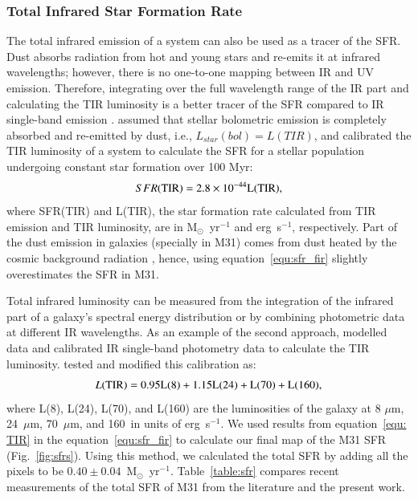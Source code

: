 \subsubsection{Total Infrared Star Formation Rate}
\label{sec:sfr_fir}
The total infrared emission of a system can also be used as a tracer of the SFR. Dust absorbs radiation from hot and young stars and re-emits it at infrared wavelengths; however, there is no one-to-one mapping between IR and UV emission. Therefore, integrating over the full wavelength range of the IR part and calculating the TIR luminosity is a better tracer of the SFR compared to IR single-band emission \citep{Calzetti13}. \citet{Calzetti13} assumed that stellar bolometric emission is completely absorbed and re-emitted by dust, i.e., $L_{star}(bol) = L(TIR)$, and calibrated the TIR luminosity of a system to calculate the SFR for a stellar population undergoing constant star formation over 100 Myr:
\begin{equation}
\label{equ:sfr_fir}
SFR(\rm TIR) = 2.8 \times10^{-44}L(\rm TIR),
\end{equation}
\noindent where SFR(TIR) and L(TIR), the star formation rate calculated from TIR emission and TIR luminosity, are in M$_{\odot}$~yr$^{-1}$ and erg~s$^{-1}$, respectively. Part of the dust emission in galaxies (specially in M31) comes from dust heated by the cosmic background radiation \citep[e.g.][]{Dole06, Calzetti13, Mattsson14}, hence, using equation~\ref{equ:sfr_fir} slightly overestimates the SFR in M31.  

Total infrared luminosity can be measured from the integration of the infrared part of a galaxy's spectral energy distribution or by combining photometric data at different IR wavelengths. As an example of the second approach, \citet{Draine07} modelled \Spitzer data and calibrated IR single-band photometry data to calculate the TIR luminosity. \citet{Boquien10} tested and modified this calibration as:
\begin{equation}
 \label{equ: TIR}
L(\rm TIR) = 0.95L(8) + 1.15L(24) + L(70) + L(160),
\end{equation}
\noindent where L(8), L(24), L(70), and L(160) are the luminosities of the galaxy at 8 $\mu$m, 24~$\mu$m, 70~$\mu$m, and 160~\um in units of erg~s$^{-1}$. We used results from equation~\ref{equ: TIR} in the equation~\ref{equ:sfr_fir} to calculate our final map of the M31 SFR (Fig.~\ref{fig:sfrs}). Using this method, we calculated the total SFR by adding all the pixels to be $0.40 \pm 0.04$~M$_{\odot}$~yr$^{-1}$. Table~\ref{table:sfr} compares recent measurements of the total SFR of M31 from the literature and the present work. 


